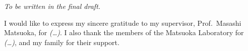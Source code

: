 
\noindent
\emph{To be written in the final draft.}

I would like to express my sincere gratitude to my supervisor,
Prof.\ Masashi Matsuoka, for \emph{(\dots)}. I also thank the members of
the Matsuoka Laboratory for \emph{(\dots)}, and my family for their support.
